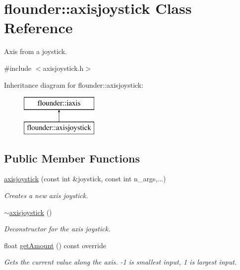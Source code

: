 \hypertarget{classflounder_1_1axisjoystick}{}\section{flounder\+:\+:axisjoystick Class Reference}
\label{classflounder_1_1axisjoystick}


Axis from a joystick.  




{\ttfamily \#include $<$axisjoystick.\+h$>$}

Inheritance diagram for flounder\+:\+:axisjoystick\+:\begin{figure}[H]
\begin{center}
\leavevmode
\includegraphics[height=2.000000cm]{classflounder_1_1axisjoystick}
\end{center}
\end{figure}
\subsection*{Public Member Functions}
\begin{DoxyCompactItemize}
\item 
\hyperlink{classflounder_1_1axisjoystick_a6415074e9ce0f9aae1d8071dc90a5f93}{axisjoystick} (const int \&joystick, const int n\+\_\+args,...)
\begin{DoxyCompactList}\small\item\em Creates a new axis joystick. \end{DoxyCompactList}\item 
\hyperlink{classflounder_1_1axisjoystick_aa006f728b79d1f0bd5101070782fcbb9}{$\sim$axisjoystick} ()
\begin{DoxyCompactList}\small\item\em Deconstructor for the axis joystick. \end{DoxyCompactList}\item 
float \hyperlink{classflounder_1_1axisjoystick_ae1c3dafedcb9458be0172e83f4197dac}{get\+Amount} () const override
\begin{DoxyCompactList}\small\item\em Gets the current value along the axis. -\/1 is smallest input, 1 is largest input. \end{DoxyCompactList}\end{DoxyCompactItemize}
